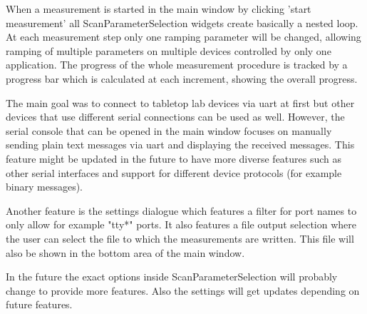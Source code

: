 When a measurement is started in the main window by clicking 'start measurement' all ScanParameterSelection widgets create basically a nested loop. At each measurement step only one ramping parameter will be changed, allowing ramping of multiple parameters on multiple devices controlled by only one application. The progress of the whole measurement procedure is tracked by a progress bar which is calculated at each increment, showing the overall progress.
\par\bigskip

The main goal was to connect to tabletop lab devices via uart at first but other devices that use different serial connections can be used as well. However, the serial console that can be opened in the main window focuses on manually sending plain text messages via uart and displaying the received messages. This feature might be updated in the future to have more diverse features such as other serial interfaces and support for different device protocols (for example binary messages).\par\bigskip

Another feature is the settings dialogue which features a filter for port names to only allow for example "tty*" ports. It also features a file output selection where the user can select the file to which the measurements are written. This file will also be shown in the bottom area of the main window.
\par\bigskip

In the future the exact options inside ScanParameterSelection will probably change to provide more features. Also the settings will get updates depending on future features.